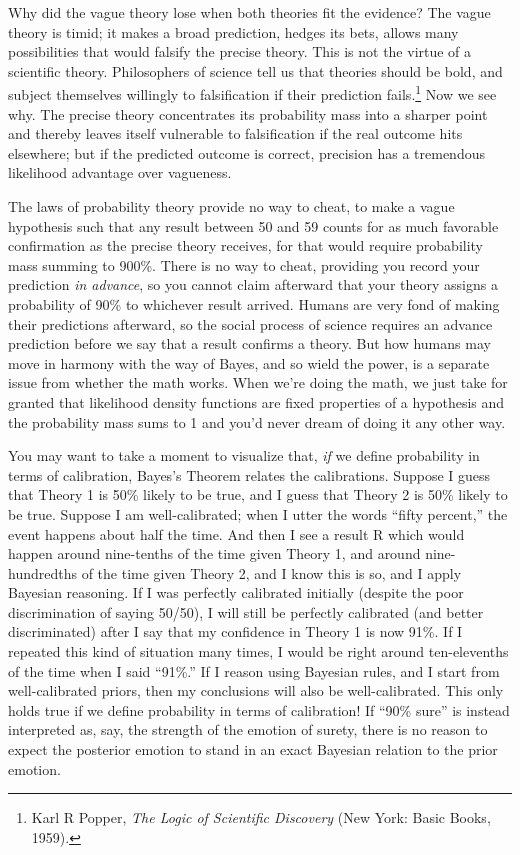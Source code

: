 {
 Why did the vague theory lose when both theories fit the evidence?
The vague theory is timid; it makes a broad prediction, hedges its
bets, allows many possibilities that would falsify the precise theory.
This is not the virtue of a scientific theory. Philosophers of science
tell us that theories should be bold, and subject themselves willingly
to falsification if their prediction fails.\footnote{Karl R Popper, \textit{The Logic of Scientific Discovery} (New
York: Basic Books, 1959).} Now we
see why. The precise theory concentrates its probability mass into a
sharper point and thereby leaves itself vulnerable to falsification if
the real outcome hits elsewhere; but if the predicted outcome is
correct, precision has a tremendous likelihood advantage over
vagueness.}

{
 The laws of probability theory provide no way to cheat, to make a
vague hypothesis such that any result between 50 and 59 counts for as
much favorable confirmation as the precise theory receives, for that
would require probability mass summing to 900\%. There is no way to
cheat, providing you record your prediction \textit{in advance}, so you
cannot claim afterward that your theory assigns a probability of 90\%
to whichever result arrived. Humans are very fond of making their
predictions afterward, so the social process of science requires an
advance prediction before we say that a result confirms a theory. But
how humans may move in harmony with the way of Bayes, and so wield the
power, is a separate issue from whether the math works. When
we're doing the math, we just take for granted that
likelihood density functions are fixed properties of a hypothesis and
the probability mass sums to 1 and you'd never dream of
doing it any other way.}

{
 You may want to take a moment to visualize that, \textit{if} we
define probability in terms of calibration, Bayes's
Theorem relates the calibrations. Suppose I guess that Theory 1 is 50\%
likely to be true, and I guess that Theory 2 is 50\% likely to be true.
Suppose I am well-calibrated; when I utter the words
``fifty percent,'' the event happens
about half the time. And then I see a result R which would happen
around nine-tenths of the time given Theory 1, and around
nine-hundredths of the time given Theory 2, and I know this is so, and
I apply Bayesian reasoning. If I was perfectly calibrated initially
(despite the poor discrimination of saying 50/50), I will still be
perfectly calibrated (and better discriminated) after I say that my
confidence in Theory 1 is now 91\%. If I repeated this kind of
situation many times, I would be right around ten-elevenths of the time
when I said ``91\%.'' If I reason
using Bayesian rules, and I start from well-calibrated priors, then my
conclusions will also be well-calibrated. This only holds true if we
define probability in terms of calibration! If ``90\%
sure'' is instead interpreted as, say, the strength
of the emotion of surety, there is no reason to expect the posterior
emotion to stand in an exact Bayesian relation to the prior emotion.}


